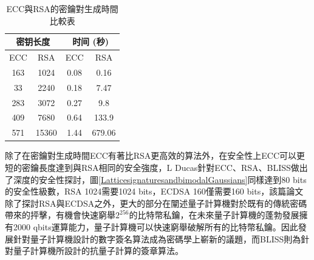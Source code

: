 				\begin{table}[htbp]
				\centering
				\caption{ECC與RSA的密鑰對生成時間比較表\supercite{Performancecomparisonofellipticcurveandrsadigitalsignatures}}
				\label{ECCtime}
				\begin{tabular}{|c|c|c|c|}
				\hline
				\multicolumn{2}{|c|}{密钥长度} & \multicolumn{2}{c|}{时间 (秒)} \\ \hline
				ECC & RSA & ECC & RSA \\ \hline
				163 & 1024 & 0.08 & 0.16 \\ \hline
				33 & 2240 & 0.18 & 7.47 \\ \hline
				283 & 3072 & 0.27 & 9.8 \\ \hline
				409 & 7680 & 0.64 & 133.9 \\ \hline
				571 & 15360 & 1.44 & 679.06 \\ \hline
				\end{tabular}
				\end{table}

				除了在密鑰對生成時間ECC有著比RSA更高效的算法外，在安全性上ECC可以更短的密鑰長度達到與RSA相同的安全強度，L Ducas針對ECC、RSA、BLISS\supercite{LatticesignaturesandbimodalGaussians}做出了深度的安全性探討\supercite{LatticesignaturesandbimodalGaussians}，圖\ref{LatticesignaturesandbimodalGaussians}同樣達到80 bits的安全性級數，RSA 1024需要1024 bits，ECDSA 160\supercite{DeploymentsofEllipticCurveCryptography}僅需要160 bits，該篇論文除了探討RSA與ECDSA之外，更大的部分在闡述量子計算機對於既有的傳統密碼帶來的抨擊，有機會快速窮舉$2^{256}$的比特幣私鑰，在未來量子計算機的蓬勃發展擁有2000 qbits運算能力，量子計算機可以快速窮舉破解所有的比特幣私鑰。因此發展針對量子計算機設計的數字簽名算法成為密碼學上嶄新的議題，而BLISS則為針對量子計算機所設計的抗量子計算的簽章算法。

